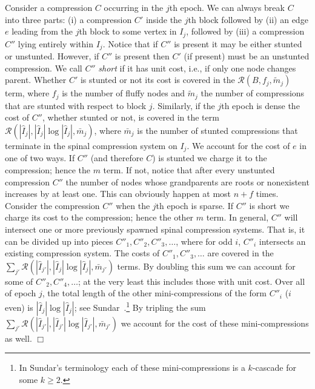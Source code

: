 \documentclass{article}
\newenvironment{proof}{\noindent {\bf Proof:}}{\hfill$\Box$}
\newcommand{\mup}{\bar{m}}
\newcommand{\mdown}{\tilde{m}}
\newcommand{\Rec}{\mathscr{R}}
\begin{document}
\begin{proof}
Consider a compression $C$ occurring in the $j$th epoch.  
We can always break $C$ into three parts: (i) a compression $C'$ inside the $j$th block
followed by (ii) an edge $e$ leading from the $j$th block to some vertex in $I_j$, followed
by (iii) a compression $C''$ lying entirely within $I_j$.  Notice that if $C''$ is present it may be
either stunted or unstunted.  
However, if $C''$ is present then $C'$ (if present) must be an unstunted compression.
We call $C''$ {\em short} if it has unit cost, i.e., if only one node changes parent.
Whether $C'$ is stunted or not its cost is covered in the $\Rec(B,f_{j},\mdown_{j})$ term, 
where $f_{j}$ is the number of fluffy nodes and $\mdown_{j}$ the
number of compressions that are stunted with respect to block $j$.  
Similarly, if the $j$th epoch is dense the cost of $C''$, whether stunted or not, is covered in the term
$\Rec(|\hat{I}_j|, |\hat{I}_j|\log|\hat{I}_j|, \mup_j)$, where $\mup_j$ is the number of stunted compressions that terminate in 
the spinal compression system on $I_j$.  We account for the cost of $e$ in one of two ways.  If $C''$ (and therefore $C$)
is stunted we charge it to the compression; hence the $m$ term.  If not, notice that after every unstunted compression $C''$
the number of nodes whose grandparents are roots or nonexistent increases by at least one.  This can obviously happen
at most $n+f$ times.
Consider the compression $C''$ when the $j$th epoch is sparse.  If $C''$ is short we charge its cost to the compression; hence the other $m$ term.
In general, $C''$ will intersect one or more previously spawned spinal compression systems.  That is, it can be divided up
into pieces $C''_1, C''_2, C''_3,\ldots$, where for odd $i$, $C''_i$ intersects an existing compression system.
The costs of $C''_1, C''_3,\ldots$ are covered in the $\sum_{j'} \Rec(|\hat{I}_{j'}|, |\hat{I}_j|\log|\hat{I}_j|, \mup_{j'})$ terms.
By doubling this sum we can account for some of $C''_2,C''_4,\ldots$; at the very least this includes those with unit cost.
Over all of epoch $j$, the total length of the other mini-compressions of the form $C''_i$ ($i$ even)
is $|\hat{I}_{j}|\log|\hat{I}_j|$;  see Sundar~\cite{Sundar92}.\footnote{In Sundar's terminology each of these mini-compressions is a $k$-cascade for some $k\ge 2$.}
By tripling the sum $\sum_{j'} \Rec(|\hat{I}_{j'}|, |\hat{I}_{j'}|\log|\hat{I}_{j'}|, \mup_{j'})$ we account for the cost of these mini-compressions as well.
\end{proof}
\end{document}
